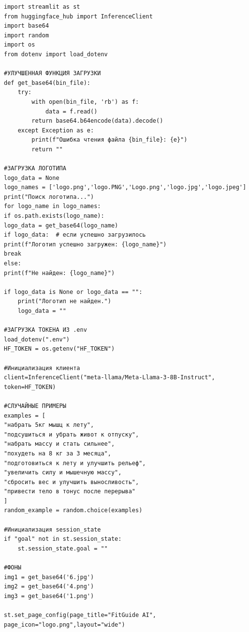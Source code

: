 \documentclass[14pt, a4paper]{extarticle}
\begin{document}
\begin{verbatim}
import streamlit as st
from huggingface_hub import InferenceClient
import base64
import random
import os
from dotenv import load_dotenv

#УЛУЧШЕННАЯ ФУНКЦИЯ ЗАГРУЗКИ
def get_base64(bin_file):
    try:
        with open(bin_file, 'rb') as f:
            data = f.read()
        return base64.b64encode(data).decode()
    except Exception as e:
        print(f"Ошибка чтения файла {bin_file}: {e}")
        return ""

#ЗАГРУЗКА ЛОГОТИПА
logo_data = None
logo_names = ['logo.png','logo.PNG','Logo.png','logo.jpg','logo.jpeg']
print("Поиск логотипа...")
for logo_name in logo_names:
if os.path.exists(logo_name):
logo_data = get_base64(logo_name)
if logo_data:  # если успешно загрузилось
print(f"Логотип успешно загружен: {logo_name}")
break
else:
print(f"Не найден: {logo_name}")

if logo_data is None or logo_data == "":
    print("Логотип не найден.")
    logo_data = ""

#ЗАГРУЗКА ТОКЕНА ИЗ .env
load_dotenv(".env")
HF_TOKEN = os.getenv("HF_TOKEN")

#Инициализация клиента
client=InferenceClient("meta-llama/Meta-Llama-3-8B-Instruct",
token=HF_TOKEN)

#СЛУЧАЙНЫЕ ПРИМЕРЫ
examples = [
"набрать 5кг мышц к лету",
"подсушиться и убрать живот к отпуску",
"набрать массу и стать сильнее",
"похудеть на 8 кг за 3 месяца",
"подготовиться к лету и улучшить рельеф",
"увеличить силу и мышечную массу",
"сбросить вес и улучшить выносливость",
"привести тело в тонус после перерыва"
]
random_example = random.choice(examples)

#Инициализация session_state
if "goal" not in st.session_state:
    st.session_state.goal = ""

#ФОНЫ
img1 = get_base64('6.jpg')
img2 = get_base64('4.png')
img3 = get_base64('1.png')

st.set_page_config(page_title="FitGuide AI",
page_icon="logo.png",layout="wide")


\end{verbatim}
\end{document}
